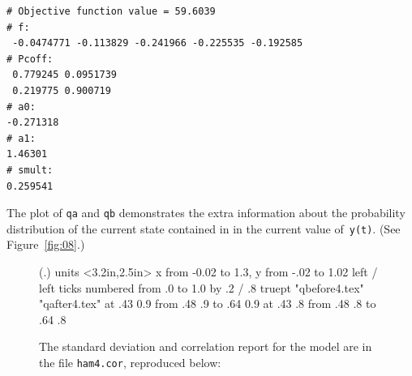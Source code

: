 \documentclass{admbmanual}
\begin{document}
\begin{lstlisting}
# Objective function value = 59.6039
# f:
 -0.0474771 -0.113829 -0.241966 -0.225535 -0.192585
# Pcoff:
 0.779245 0.0951739
 0.219775 0.900719
# a0:
-0.271318
# a1:
1.46301
# smult:
0.259541
\end{lstlisting}

The plot of \texttt{qa} and \texttt{qb} demonstrates the extra information about
the probability distribution of the current state contained in in the current
value of~\texttt{y(t)}. (See Figure~\ref{fig:08}.)
\begin{figure}[htbp]
\centering\hskip1pt\beginpicture
  \setplotsymbol ({\eightrm .})
  \setcoordinatesystem units <3.2in,2.5in>
  \setplotarea x from -0.02 to 1.3, y from -.02 to 1.02
  \axis left
  /
  \axis left
    ticks numbered from .0 to 1.0 by .2
  /
\linethickness .8 truept
\setdashpattern <1pt,1pt,1pt,1pt>
{
   \color{red}
 \plot  "qbefore4.tex"
   \color{blue}
\setdashpattern <1pt,3pt,4pt,3pt>
 \plot  "qafter4.tex"
   \color{red}
  at .43 0.9
 \putrule from .48 .9 to .64 0.9
   \color{blue}
  at .43 .8
 \putrule from .48 .8 to .64 .8
   \color{black}
}
\endpicture
\bigskip
\medskip
\par
\raggedright
The standard deviation and correlation report for the model are in the file
\texttt{ham4.cor}, reproduced below:\par

\end{figure}
\end{document}
